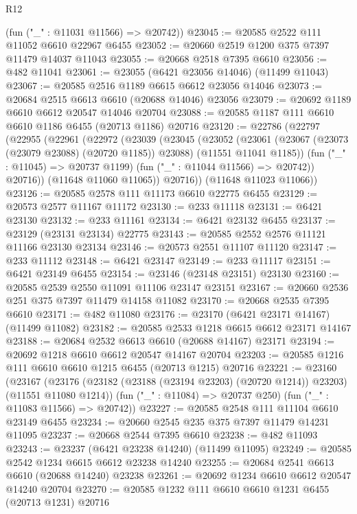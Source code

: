 \begin{lexlean}{R12}
\begin{coremodule}
      (fun ("_" : @11031 @11566) => @20742))
@23045 := @20585 @2522 @111 @11052 @6610 @22967 @6455
@23052 := @20660 @2519 @1200 @375 @7397 @11479 @14037 @11043
@23055 := @20668 @2518 @7395 @6610
@23056 := @482 @11041
@23061 := @23055 (@6421 @23056 @14046) (@11499 @11043)
@23067 := @20585 @2516 @1189 @6615 @6612 @23056 @14046
@23073 := @20684 @2515 @6613 @6610 (@20688 @14046) @23056
@23079 := @20692 @1189 @6610 @6612 @20547 @14046 @20704
@23088 := @20585 @1187 @111 @6610 @6610 @1186 @6455 (@20713 @1186) @20716
@23120 := @22786
    (@22797
      (@22955
        (@22961
          (@22972
            (@23039
              (@23045
                (@23052
                  (@23061
                    (@23067 (@23073 (@23079 @23088) (@20720 @1185)) @23088)
                    (@11551 @11041 @1185))
                  (fun ("_" : @11045) => @20737 @1199)
                  (fun ("_" : @11044 @11566) => @20742))
                @20716))
            (@11648 @11060 @11065))
          @20716))
      (@11648 @11023 @11066))
@23126 := @20585 @2578 @111 @11173 @6610 @22775 @6455
@23129 := @20573 @2577 @11167 @11172
@23130 := @233 @11118
@23131 := @6421 @23130
@23132 := @233 @11161
@23134 := @6421 @23132 @6455
@23137 := @23129 (@23131 @23134) @22775
@23143 := @20585 @2552 @2576 @11121 @11166 @23130 @23134
@23146 := @20573 @2551 @11107 @11120
@23147 := @233 @11112
@23148 := @6421 @23147
@23149 := @233 @11117
@23151 := @6421 @23149 @6455
@23154 := @23146 (@23148 @23151) @23130
@23160 := @20585 @2539 @2550 @11091 @11106 @23147 @23151
@23167 := @20660 @2536 @251 @375 @7397 @11479 @14158 @11082
@23170 := @20668 @2535 @7395 @6610
@23171 := @482 @11080
@23176 := @23170 (@6421 @23171 @14167) (@11499 @11082)
@23182 := @20585 @2533 @1218 @6615 @6612 @23171 @14167
@23188 := @20684 @2532 @6613 @6610 (@20688 @14167) @23171
@23194 := @20692 @1218 @6610 @6612 @20547 @14167 @20704
@23203 := @20585 @1216 @111 @6610 @6610 @1215 @6455 (@20713 @1215) @20716
@23221 := @23160
    (@23167
      (@23176 (@23182 (@23188 (@23194 @23203) (@20720 @1214)) @23203) (@11551 @11080 @1214))
      (fun ("_" : @11084) => @20737 @250)
      (fun ("_" : @11083 @11566) => @20742))
@23227 := @20585 @2548 @111 @11104 @6610 @23149 @6455
@23234 := @20660 @2545 @235 @375 @7397 @11479 @14231 @11095
@23237 := @20668 @2544 @7395 @6610
@23238 := @482 @11093
@23243 := @23237 (@6421 @23238 @14240) (@11499 @11095)
@23249 := @20585 @2542 @1234 @6615 @6612 @23238 @14240
@23255 := @20684 @2541 @6613 @6610 (@20688 @14240) @23238
@23261 := @20692 @1234 @6610 @6612 @20547 @14240 @20704
@23270 := @20585 @1232 @111 @6610 @6610 @1231 @6455 (@20713 @1231) @20716

\end{coremodule}
\end{lexlean}
